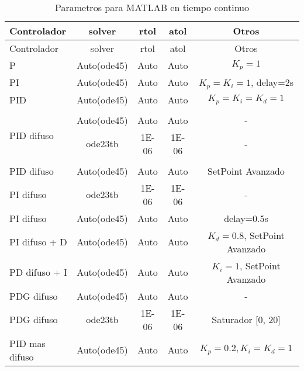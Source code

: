         {\setlength\LTleft{0pt}
        \setlength\LTright{0pt}
        \centering
        \footnotesize
        \renewcommand{\arraystretch}{0.89}
        \begin{longtable}{l @{\extracolsep{\fill}} cccc}
        \caption[Parametros para MATLAB en tiempo continuo]{Parametros para MATLAB en tiempo continuo} 
        \label{tab:parametrosLVc} \\
        \toprule
        Controlador  & solver & rtol & atol & Otros       \\ \midrule
        \endfirsthead
        \toprule
        Controlador  & solver & rtol & atol & Otros       \\ \midrule
        \endhead
        \bottomrule
        \endfoot
         P                          & Auto(ode45)   &     Auto      & Auto          & $K_p=1$                       \\
         PI                         & Auto(ode45)   &     Auto      & Auto          & $K_p=K_i=1$, delay=2s         \\
         PID                        & Auto(ode45)   &     Auto      & Auto          & $K_p=K_i=K_d=1$               \\
         &&&& \\[-3pt]        
         \multirow{2}{*}{PID difuso}& Auto(ode45)   &     Auto      & Auto          & -                             \\
                                    & ode23tb       & \num{1E-06}   & \num{1E-06}   & -                             \\
         &&&& \\[-3pt]  
         PID difuso                 & Auto(ode45)   & Auto          & Auto          & SetPoint Avanzado             \\
         PI difuso                  & ode23tb       & \num{1E-06}   & \num{1E-06}   & -                             \\
         PI difuso                  & Auto(ode45)   & Auto          & Auto          & delay=0.5s                    \\
         PI difuso + D              & Auto(ode45)   & Auto          & Auto          & $K_d=0.8$, SetPoint Avanzado  \\
         PD difuso + I              & Auto(ode45)   & Auto          & Auto          & $K_i=1$, SetPoint Avanzado    \\
         PDG difuso                 & Auto(ode45)   & Auto          & Auto          & -                             \\
         PDG difuso                 & ode23tb       & \num{1E-06}   & \num{1E-06}   & Saturador [0, 20]             \\
         PID mas difuso             & Auto(ode45)   & Auto          & Auto          & $K_p=0.2, K_i=K_d=1$          \\
        \end{longtable}}

